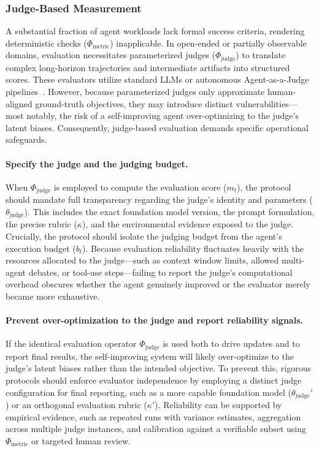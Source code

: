 \documentclass{article}
\begin{document}
\subsubsection{Judge-Based Measurement}
\label{sec:Judge_based_measurement}
A substantial fraction of agent workloads lack formal success criteria, rendering deterministic checks ($\Phi_{\text{metric}}$) inapplicable. In open-ended or partially observable domains, evaluation necessitates parameterized judges ($\Phi_{\text{judge}}$) to translate complex long-horizon trajectories and intermediate artifacts into structured scores. These evaluators utilize standard LLMs or autonomous Agent-as-a-Judge pipelines~\citep{zhuge2024agentasajudgeevaluateagentsagents, you2026agentasajudge, zhang-etal-2025-evaluation, wadhwa2025evalagentdiscoveringimplicitevaluation, xu-etal-2025-learning, han2025verifiagentunifiedverificationagent}. However, because parameterized judges only approximate human-aligned ground-truth objectives, they may introduce distinct vulnerabilities—most notably, the risk of a self-improving agent over-optimizing to the judge's latent biases. Consequently, judge-based evaluation demands specific operational safeguards.


\paragraph{Specify the judge and the judging budget.} When $\Phi_{\text{judge}}$ is employed to compute the evaluation score ($m_t$), the protocol should mandate full transparency regarding the judge's identity and parameters ($\theta_{\text{judge}}$). This includes the exact foundation model version, the prompt formulation, the precise rubric ($\kappa$), and the environmental evidence exposed to the judge. Crucially, the protocol should isolate the judging budget from the agent's execution budget ($b_t$). Because evaluation reliability fluctuates heavily with the resources allocated to the judge---such as context window limits, allowed multi-agent debates, or tool-use steps---failing to report the judge's computational overhead obscures whether the agent genuinely improved or the evaluator merely became more exhaustive.


\paragraph{Prevent over-optimization to the judge and report reliability signals.} If the identical evaluation operator $\Phi_{\text{judge}}$ is used both to drive updates and to report final results, the self-improving system will likely over-optimize to the judge's latent biases rather than the intended objective. To prevent this, rigorous protocols should enforce evaluator independence by employing a distinct judge configuration for final reporting, such as a more capable foundation model ($\theta_{\text{judge}}'$) or an orthogonal evaluation rubric ($\kappa'$). Reliability can be supported by empirical evidence, such as repeated runs with variance estimates, aggregation across multiple judge instances, and calibration against a verifiable subset using $\Phi_{\text{metric}}$ or targeted human review.
\end{document}
